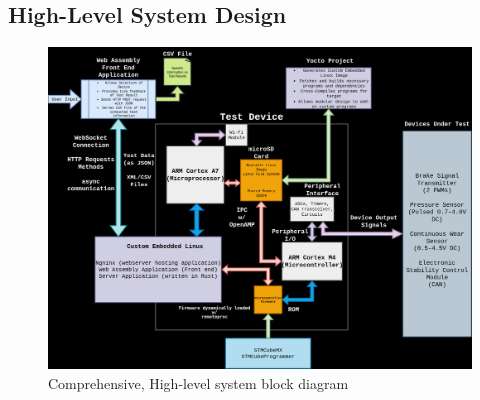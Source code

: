 \documentclass[12pt]{article}
\begin{document}
\subsection{High-Level System Design}

\begin{figure}[H]
  \includegraphics[width=\textwidth]{../assets/block_diagram.png}
  \caption{Comprehensive, High-level system block diagram}
\end{figure}
\end{document}
